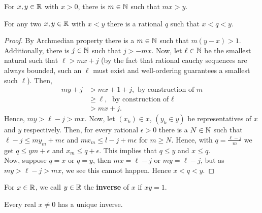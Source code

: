 \begin{recall}
	For \(x, y \in \mathbb{R}\)	 with \(x>0\), there is \(m \in \mathbb{N}\) such that \(mx > y\).
\end{recall}
\begin{corollary}
	For any two \(x, y \in \mathbb{R}\) with \(x<y\) there is a rational \(q\) such that \(x<q<y\).
\end{corollary}
\begin{proof}
	By Archmedian property there is a \(m \in \mathbb{N}\) such that \(m\left( y-x \right) > 1 \). Additionally, there is \(j \in \mathbb{N}\) such that  \(j > -mx\). Now, let \(\ell\in \mathbb{N}\) be the smallest natural such that \(\ell > mx + j\) (by the fact that rational cauchy sequences are always bounded, such an \(\ell\) must exist and well-ordering guarantees a smallest such \(\ell\)). Then,
	\begin{align*}
		my + j &> mx + 1 + j, \text{ by construction of \(m\)}\\
		       &\ge \ell, \text{ by construction of \(\ell\)}\\
		       &> mx + j
	.\end{align*}
	Hence, \(my > \ell - j > mx\). Now, let \(\left( x_{k} \right)\in x \), \(\left( y_{k} \in y \right) \) be representatives of \(x\) and \(y\) respectively. Then, for every rational \(\epsilon > 0\) there is a \(N \in \mathbb{N}\) such that \(\ell - j \le my_{m} + m\epsilon\) and \(mx_{m}\le l - j + m\epsilon\) for \(m\ge N\). Hence, with \(q = \frac{\ell-j}{m}\) we get \(q \le ym + \epsilon\) and \(x_{m} \le q + \epsilon\). This implies that \(q \le y\) and \(x \le q\).\\
	Now, suppose \(q= x\) or \(q= y\), then \(mx = \ell - j\) or \(my = \ell - j\), but as \(my > \ell - j > mx\), we see this cannot happen. Hence \(x < q < y\).
\end{proof}
\begin{definition}[Inverses]
	For \(x \in \mathbb{R}\), we call \(y \in \mathbb{R}\) the \textbf{inverse} of \(x\) if \(xy = 1\).
\end{definition}
\begin{proposition}
	Every real \(x\neq 0\)  has a unique inverse.
\end{proposition}
